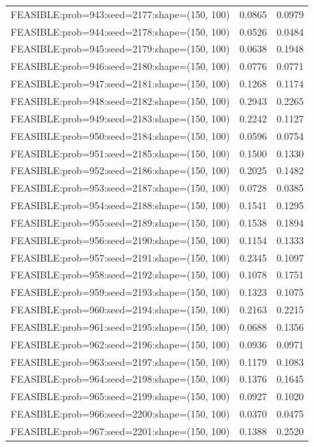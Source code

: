 \begin{longtable}{lcc}
FEASIBLE:prob=943:seed=2177:shape=(150, 100) &   0.0865 & 0.0979 \\
FEASIBLE:prob=944:seed=2178:shape=(150, 100) &   0.0526 & 0.0484 \\
FEASIBLE:prob=945:seed=2179:shape=(150, 100) &   0.0638 & 0.1948 \\
FEASIBLE:prob=946:seed=2180:shape=(150, 100) &   0.0776 & 0.0771 \\
FEASIBLE:prob=947:seed=2181:shape=(150, 100) &   0.1268 & 0.1174 \\
FEASIBLE:prob=948:seed=2182:shape=(150, 100) &   0.2943 & 0.2265 \\
FEASIBLE:prob=949:seed=2183:shape=(150, 100) &   0.2242 & 0.1127 \\
FEASIBLE:prob=950:seed=2184:shape=(150, 100) &   0.0596 & 0.0754 \\
FEASIBLE:prob=951:seed=2185:shape=(150, 100) &   0.1500 & 0.1330 \\
FEASIBLE:prob=952:seed=2186:shape=(150, 100) &   0.2025 & 0.1482 \\
FEASIBLE:prob=953:seed=2187:shape=(150, 100) &   0.0728 & 0.0385 \\
FEASIBLE:prob=954:seed=2188:shape=(150, 100) &   0.1541 & 0.1295 \\
FEASIBLE:prob=955:seed=2189:shape=(150, 100) &   0.1538 & 0.1894 \\
FEASIBLE:prob=956:seed=2190:shape=(150, 100) &   0.1154 & 0.1333 \\
FEASIBLE:prob=957:seed=2191:shape=(150, 100) &   0.2345 & 0.1097 \\
FEASIBLE:prob=958:seed=2192:shape=(150, 100) &   0.1078 & 0.1751 \\
FEASIBLE:prob=959:seed=2193:shape=(150, 100) &   0.1323 & 0.1075 \\
FEASIBLE:prob=960:seed=2194:shape=(150, 100) &   0.2163 & 0.2215 \\
FEASIBLE:prob=961:seed=2195:shape=(150, 100) &   0.0688 & 0.1356 \\
FEASIBLE:prob=962:seed=2196:shape=(150, 100) &   0.0936 & 0.0971 \\
FEASIBLE:prob=963:seed=2197:shape=(150, 100) &   0.1179 & 0.1083 \\
FEASIBLE:prob=964:seed=2198:shape=(150, 100) &   0.1376 & 0.1645 \\
FEASIBLE:prob=965:seed=2199:shape=(150, 100) &   0.0927 & 0.1020 \\
FEASIBLE:prob=966:seed=2200:shape=(150, 100) &   0.0370 & 0.0475 \\
FEASIBLE:prob=967:seed=2201:shape=(150, 100) &   0.1388 & 0.2520 \\

\end{longtable}

